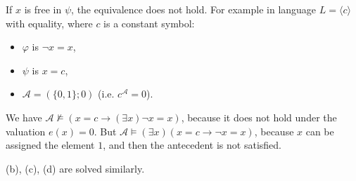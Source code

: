 \begin{problem}
\begin{solution}
            If $x$ is free in $\psi$, the equivalence does not hold. For example in language $L=\langle c\rangle$ with equality, where $c$ is a constant symbol:
            \begin{itemize}
                \item $\varphi$ is $\neg x=x$,
                \item $\psi$ is $x=c$,
                \item $\mathcal A=(\{0,1\};0)$ (i.e. $c^\mathcal A=0$).
            \end{itemize}
            We have $\mathcal A\not\models (x=c\to (\exists x) \neg x=x)$, because it does not hold under the valuation $e(x)=0$. But $\mathcal A\models(\exists x)(x=c\to \neg x=x)$, because $x$ can be assigned the element $1$, and then the antecedent is not satisfied.

        (b), (c), (d) are solved similarly. 
                    
    \end{solution}

\end{problem}


